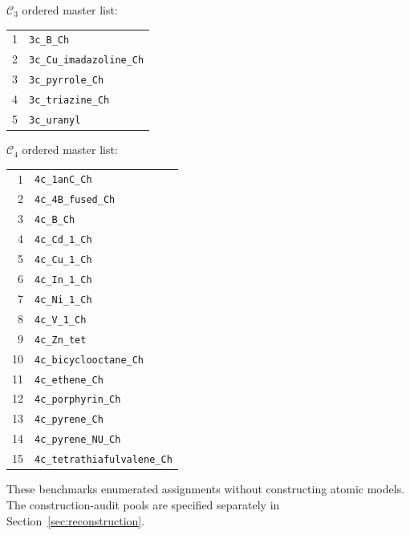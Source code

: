\documentclass[a5paper, 10pt]{article}
\begin{document}
\noindent $\mathcal{C}_{3}$ ordered master list:
\begin{center}\small
\begin{tabular}{rl}
1 & \texttt{3c\_B\_Ch} \\
2 & \texttt{3c\_Cu\_imadazoline\_Ch} \\
3 & \texttt{3c\_pyrrole\_Ch} \\
4 & \texttt{3c\_triazine\_Ch} \\
5 & \texttt{3c\_uranyl} \\
\end{tabular}
\end{center}

\noindent $\mathcal{C}_{4}$ ordered master list:
\begin{center}\small
\begin{tabular}{rl}
1 & \texttt{4c\_1anC\_Ch} \\
2 & \texttt{4c\_4B\_fused\_Ch} \\
3 & \texttt{4c\_B\_Ch} \\
4 & \texttt{4c\_Cd\_1\_Ch} \\
5 & \texttt{4c\_Cu\_1\_Ch} \\
6 & \texttt{4c\_In\_1\_Ch} \\
7 & \texttt{4c\_Ni\_1\_Ch} \\
8 & \texttt{4c\_V\_1\_Ch} \\
9 & \texttt{4c\_Zn\_tet} \\
10 & \texttt{4c\_bicyclooctane\_Ch} \\
11 & \texttt{4c\_ethene\_Ch} \\
12 & \texttt{4c\_porphyrin\_Ch} \\
13 & \texttt{4c\_pyrene\_Ch} \\
14 & \texttt{4c\_pyrene\_NU\_Ch} \\
15 & \texttt{4c\_tetrathiafulvalene\_Ch} \\
\end{tabular}
\end{center}

These benchmarks enumerated assignments without constructing atomic models. The construction-audit pools are specified separately in Section~\ref{sec:reconstruction}.
\end{document}
